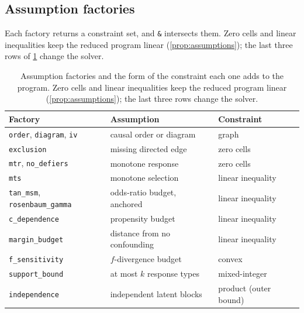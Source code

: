 \subsection{Assumption factories}
\label{sec:factories}

Each factory returns a constraint set, and \texttt{\&} intersects them. Zero cells and linear inequalities keep the reduced program linear (\cref{prop:assumptions}); the last three rows of \cref{tab:catalog} change the solver.

\begin{table}[ht]
\centering
\caption{Assumption factories and the form of the constraint each one adds
to the program. Zero cells and linear inequalities keep the reduced program
linear (\cref{prop:assumptions}); the last three rows change the solver.}
\label{tab:catalog}
\small
\begin{tabular}{@{}>{\raggedright\arraybackslash}p{}>{\raggedright\arraybackslash}p{}l@{}}
\toprule
Factory & Assumption & Constraint \\
\midrule
\texttt{order}, \texttt{diagram}, \texttt{iv} & causal order or diagram
  \citep{manski1990nonparametric,balke1997bounds} & graph \\
\texttt{exclusion} & missing directed edge & zero cells \\
\texttt{mtr}, \texttt{no\_defiers} & monotone response
  \citep{manski1997monotone,imbens1994identification} & zero cells \\
\texttt{mts} & monotone selection \citep{manski2000monotone} & linear inequality \\
\texttt{tan\_msm}, \texttt{rosenbaum\_gamma} & odds-ratio budget, anchored
  \citep{tan2006distributional,rosenbaum2002observational} & linear inequality \\
\texttt{c\_dependence} & propensity budget \citep{masten2018identification} & linear inequality \\
\texttt{margin\_budget} & distance from no confounding & linear inequality \\
\texttt{f\_sensitivity} & $f$-divergence budget \citep{jin2023sensitivity} & convex \\
\texttt{support\_bound} & at most $k$ response types & mixed-integer \\
\texttt{independence} & independent latent blocks & product (outer bound) \\
\bottomrule
\end{tabular}
\end{table}


